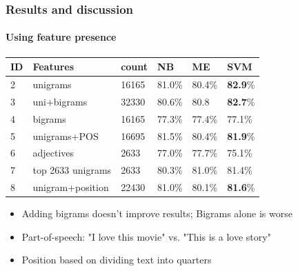 \documentclass{beamer}
\begin{document}
\begin{frame}
	\frametitle{Results and discussion}
	\framesubtitle{Using feature presence}
	\begin{center}
		\begin{table}
			\begin{tabular}{l | l | l || l | l | l}
				ID & Features & count & NB & ME & SVM \\ \hline \hline
				2 & unigrams & 16165 & 81.0\% & 80.4\% & \textbf{82.9}\% \\
				3 & uni+bigrams & 32330 & 80.6\% & 80.8 & \textbf{82.7}\% \\
				4 & bigrams & 16165 & 77.3\% & 77.4\% & 77.1\% \\ \hline \hline
				5 & unigrams+POS & 16695 & 81.5\% & 80.4\% & \textbf{81.9}\% \\
				6 & adjectives & 2633 & 77.0\% & 77.7\% & 75.1\% \\
				7 & top 2633 unigrams & 2633 & 80.3\% & 81.0\% & 81.4\% \\
				8 & unigram+position & 22430 & 81.0\% & 80.1\% & \textbf{81.6}\% \\
			\end{tabular}
		\end{table}
	\end{center}
	\pause
	\begin{itemize}
		\item Adding bigrams doesn't improve results; Bigrams alone is worse
		\item Part-of-speech: "I love this movie" vs. "This is a love story"
		\item Position based on dividing text into quarters
	\end{itemize}
\end{frame}
\end{document}

